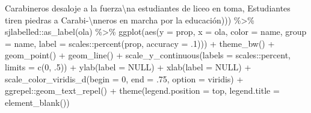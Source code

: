 \documentclass[
  12pt,
]{book}
\newenvironment{Shaded}{\begin{snugshade}}{\end{snugshade}}
\newcommand{\AttributeTok}[1]{\textcolor[rgb]{0.77,0.63,0.00}{#1}}
\newcommand{\ConstantTok}[1]{\textcolor[rgb]{0.00,0.00,0.00}{#1}}
\newcommand{\DecValTok}[1]{\textcolor[rgb]{0.00,0.00,0.81}{#1}}
\newcommand{\FunctionTok}[1]{\textcolor[rgb]{0.00,0.00,0.00}{#1}}
\newcommand{\NormalTok}[1]{#1}
\newcommand{\SpecialCharTok}[1]{\textcolor[rgb]{0.00,0.00,0.00}{#1}}
\newcommand{\StringTok}[1]{\textcolor[rgb]{0.31,0.60,0.02}{#1}}
\begin{document}
\begin{Shaded}
\begin{Highlighting}[]
                                  \StringTok{\textquotesingle{}Carabineros desaloje a la fuerza}\SpecialCharTok{\textbackslash{}n}\StringTok{a estudiantes de liceo en toma\textquotesingle{}}\NormalTok{,}
                                  \StringTok{\textquotesingle{}Estudiantes tiren piedras a Carabi{-}}\SpecialCharTok{\textbackslash{}n}\StringTok{neros en marcha por la educación\textquotesingle{}}\NormalTok{))) }\SpecialCharTok{\%\textgreater{}\%} 
\NormalTok{sjlabelled}\SpecialCharTok{::}\FunctionTok{as\_label}\NormalTok{(ola) }\SpecialCharTok{\%\textgreater{}\%} 
  \FunctionTok{ggplot}\NormalTok{(}\FunctionTok{aes}\NormalTok{(}\AttributeTok{y =}\NormalTok{ prop, }\AttributeTok{x =}\NormalTok{ ola, }\AttributeTok{color =}\NormalTok{ name, }\AttributeTok{group =}\NormalTok{ name,}
             \AttributeTok{label =}\NormalTok{ scales}\SpecialCharTok{::}\FunctionTok{percent}\NormalTok{(prop, }\AttributeTok{accuracy =}\NormalTok{ .}\DecValTok{1}\NormalTok{))) }\SpecialCharTok{+}
  \FunctionTok{theme\_bw}\NormalTok{() }\SpecialCharTok{+} 
  \FunctionTok{geom\_point}\NormalTok{() }\SpecialCharTok{+} 
  \FunctionTok{geom\_line}\NormalTok{() }\SpecialCharTok{+}
  \FunctionTok{scale\_y\_continuous}\NormalTok{(}\AttributeTok{labels =}\NormalTok{ scales}\SpecialCharTok{::}\NormalTok{percent,}
                     \AttributeTok{limits =} \FunctionTok{c}\NormalTok{(}\DecValTok{0}\NormalTok{, .}\DecValTok{5}\NormalTok{)) }\SpecialCharTok{+}
  \FunctionTok{ylab}\NormalTok{(}\AttributeTok{label =} \ConstantTok{NULL}\NormalTok{) }\SpecialCharTok{+}
  \FunctionTok{xlab}\NormalTok{(}\AttributeTok{label =} \ConstantTok{NULL}\NormalTok{) }\SpecialCharTok{+}
  \FunctionTok{scale\_color\_viridis\_d}\NormalTok{(}\AttributeTok{begin =} \DecValTok{0}\NormalTok{, }\AttributeTok{end =}\NormalTok{ .}\DecValTok{75}\NormalTok{, }\AttributeTok{option =} \StringTok{\textquotesingle{}viridis\textquotesingle{}}\NormalTok{) }\SpecialCharTok{+} 
\NormalTok{  ggrepel}\SpecialCharTok{::}\FunctionTok{geom\_text\_repel}\NormalTok{() }\SpecialCharTok{+}
  \FunctionTok{theme}\NormalTok{(}\AttributeTok{legend.position =} \StringTok{\textquotesingle{}top\textquotesingle{}}\NormalTok{,}
        \AttributeTok{legend.title =} \FunctionTok{element\_blank}\NormalTok{())}
\end{Highlighting}
\end{Shaded}
\end{document}
